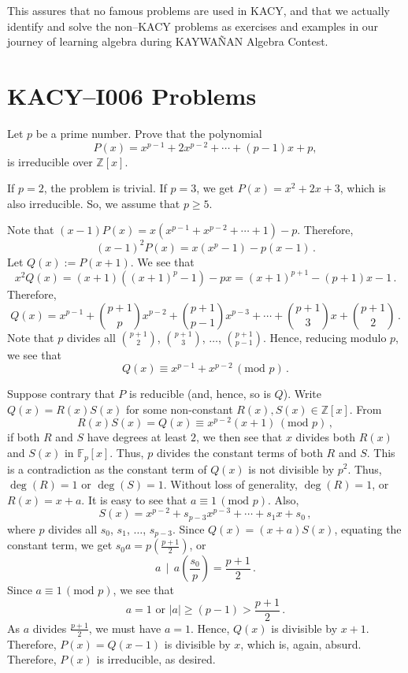 \documentclass[12pt,a4paper]{memoir}
\theoremstyle{definition}
\begin{document}
	This assures that no famous problems are used in KACY, and that we actually identify and solve the non--KACY problems as exercises and examples in our journey of learning algebra during KAYWAÑAN Algebra Contest.
	
	
	\section*{KACY--I006 Problems}
	\setcounter{question}{12}
	
	
	\begin{tcolorbox}
		\begin{question}
		Let $p$ be a prime number. Prove that the polynomial
		\[P(x)=x^{p-1}+2x^{p-2}+\cdots+(p-1)x+p,\]
		is irreducible over $\mathbb Z[x]$.
	\end{question}
	\end{tcolorbox}
	
	
	\begin{solution}[name={Solution by \href{https://artofproblemsolving.com/community/c6h354141p1919829}{Batominovski}}]
		If $p=2$, the problem is trivial. If $p=3$, we get $P(x) = x^2+2x+3$, which is also irreducible. So, we assume that $p \geq 5$.
		
		Note that $(x-1)P(x) = x\left(x^{p-1}+x^{p-2}+\cdots+1\right)-p$. Therefore,\[(x-1)^2P(x)=x\left(x^p-1\right)-p(x-1)\,.\]Let $Q(x):=P(x+1)$. We see that\[x^2Q(x) = (x+1)\left((x+1)^p-1\right)-px=(x+1)^{p+1}-(p+1)x-1\,.\]Therefore,\[Q(x)=x^{p-1}+\binom{p+1}{p}x^{p-2}+\binom{p+1}{p-1}x^{p-3}+\cdots+\binom{p+1}{3}x+\binom{p+1}{2}\,.\]Note that $p$ divides all $\binom{p+1}{2}$, $\binom{p+1}{3}$, $\ldots$, $\binom{p+1}{p-1}$. Hence, reducing modulo $p$, we see that\[Q(x) \equiv x^{p-1}+x^{p-2}\,(\text{mod }p)\,.\]
		
		Suppose contrary that $P$ is reducible (and, hence, so is $Q$). Write $Q(x)=R(x)S(x)$ for some non-constant $R(x),S(x) \in \mathbb{Z}[x]$. From\[R(x)S(x) =Q(x) \equiv x^{p-2}(x+1)\,(\text{mod }p)\,,\]if both $R$ and $S$ have degrees at least $2$, we then see that $x$ divides both $R(x)$ and $S(x)$ in $\mathbb{F}_p[x]$. Thus, $p$ divides the constant terms of both $R$ and $S$. This is a contradiction as the constant term of $Q(x)$ is not divisible by $p^2$. Thus, $\deg(R)=1$ or $\deg(S)=1$. Without loss of generality, $\deg(R)=1$, or $R(x)=x+a$. It is easy to see that $a \equiv 1\,(\text{mod }p)$. Also,\[S(x) = x^{p-2}+s_{p-3}x^{p-3}+\cdots+s_1x+s_0\,,\]where $p$ divides all $s_0$, $s_1$, $\ldots$, $s_{p-3}$. Since $Q(x)=(x+a)S(x)$, equating the constant term, we get $s_0a = p\left(\frac{p+1}{2}\right)$, or\[a \,\mid \,a \left(\frac{s_0}{p}\right)= \frac{p+1}{2}\,.\]Since $a \equiv 1\,(\text{mod }p)$, we see that\[a=1\text{ or }|a| \geq (p-1) > \frac{p+1}{2}\,.\]As $a$ divides $\frac{p+1}{2}$, we must have $a=1$. Hence, $Q(x)$ is divisible by $x+1$. Therefore, $P(x)=Q(x-1)$ is divisible by $x$, which is, again, absurd. Therefore, $P(x)$ is irreducible, as desired.
	\end{solution}
	\setcounter{question}{46}
\end{document}
